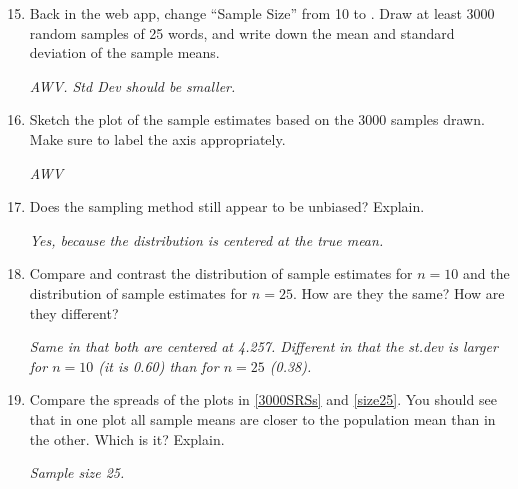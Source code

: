      \begin{enumerate}
       \setcounter{enumi}{14}
     \item Back in the web app, change ``Sample Size'' from 10 to . 
       Draw at least 3000 random samples of 25 words, and write down
       the mean and standard deviation of the sample means.
\begin{students}
  \vspace{1cm}
\end{students}    
\begin{key}
   {\it  AWV. Std Dev should be smaller.}
\end{key}

     \item \label{size25} Sketch the plot of the sample estimates based on the
       3000 samples drawn. Make sure to label the axis appropriately. 
       \begin{students}
  \vspace{3cm}
\end{students}    
\begin{key}
   {\it  AWV}
\end{key}

     \item  Does the sampling method still appear to be unbiased? Explain.
       \begin{students}
  \vspace{1cm}
\end{students}    
\begin{key}
   {\it  Yes, because the distribution is centered at the true mean.}
\end{key}

     \item  Compare and contrast the distribution of sample estimates
       for $n = 10$ and the distribution of sample estimates for $n =
       25$. How are they the same? How are they different?  
       \begin{students}
  \vspace{2cm}
\end{students}    
\begin{key}
   {\it  Same in that both are centered at 4.257.  Different in that
     the st.dev is larger for $n=10$ (it is 0.60) than for $n = 25$
     (0.38). }
\end{key}

     \item Compare the spreads of the plots in \ref{3000SRSs} and
       \ref{size25}.   You should see that in one plot all sample
       means are closer to the population mean than in the other.
       Which is it? Explain.
\begin{students}
  \vspace{1cm}
\end{students}    
\begin{key}
   {\it  Sample size 25.}
\end{key}


\end{enumerate}
